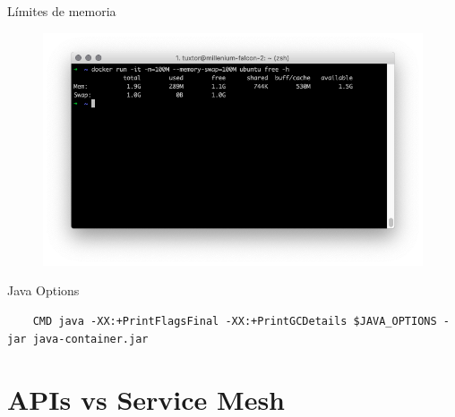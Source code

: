 \documentclass[aspectratio=169]{beamer}
\begin{document}
\begin{frame}{Límites de memoria}
    \begin{figure}
        \centering
        \includegraphics[width=0.9\linewidth]{Images/dockermem.png}
        \label{fig:container5}
    \end{figure}
\end{frame}

\begin{frame}[fragile]{Java Options}
    \begin{lstlisting}
    CMD java -XX:+PrintFlagsFinal -XX:+PrintGCDetails $JAVA_OPTIONS -jar java-container.jar
    \end{lstlisting}
\end{frame}

{
    \section{APIs vs Service Mesh}
}
\end{document}
